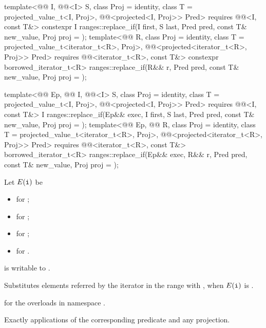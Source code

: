 \begin{itemdecl}
template<@@ I, @@<I> S, class Proj = identity,
         class T = projected_value_t<I, Proj>,
         @@<projected<I, Proj>> Pred>
  requires @@<I, const T&>
  constexpr I ranges::replace_if(I first, S last, Pred pred, const T& new_value, Proj proj = {});
template<@@ R, class Proj = identity, class T = projected_value_t<iterator_t<R>, Proj>,
         @@<projected<iterator_t<R>, Proj>> Pred>
  requires @@<iterator_t<R>, const T&>
  constexpr borrowed_iterator_t<R>
    ranges::replace_if(R&& r, Pred pred, const T& new_value, Proj proj = {});

template<@@ Ep, @@ I, @@<I> S,
         class Proj = identity, class T = projected_value_t<I, Proj>,
         @@<projected<I, Proj>> Pred>
  requires @@<I, const T&>
  I ranges::replace_if(Ep&& exec, I first, S last, Pred pred,
                       const T& new_value, Proj proj = {});
template<@@ Ep, @@ R, class Proj = identity,
         class T = projected_value_t<iterator_t<R>, Proj>,
         @@<projected<iterator_t<R>, Proj>> Pred>
  requires @@<iterator_t<R>, const T&>
  borrowed_iterator_t<R>
    ranges::replace_if(Ep&& exec, R&& r, Pred pred, const T& new_value, Proj proj = {});
\end{itemdecl}

\begin{itemdescr}
\pnum
Let $E(\tcode{i})$ be
\begin{itemize}
\item {} for ;
\item {} for ;
\item {} for ;
\item {} for .
\end{itemize}

\pnum
\mandates
{} is writable to .

\pnum
\effects
Substitutes elements referred by the iterator 
in the range  with ,
when $E(\tcode{i})$ is .

\pnum
\returns
{} for the overloads in namespace .

\pnum
\complexity
Exactly  applications
of the corresponding predicate and any projection.
\end{itemdescr}

